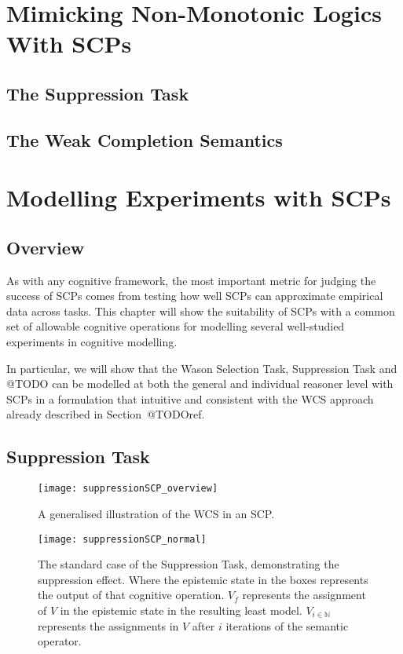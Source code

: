 \chapter{Mimicking Non-Monotonic Logics With SCPs} \label{chp:mimick}

\section{The Suppression Task}

\section{The Weak Completion Semantics}



\chapter{Modelling Experiments with SCPs} \label{chp:model}
\section{Overview}
As with any cognitive framework, the most important metric for judging the success of SCPs comes from testing how well SCPs can approximate empirical data across tasks. This chapter will show the suitability of SCPs with a common set of allowable cognitive operations for modelling several well-studied experiments in cognitive modelling.

In particular, we will show that the Wason Selection Task, Suppression Task and @TODO can be modelled at both the general and individual reasoner level with SCPs in a formulation that intuitive and consistent with the WCS approach already described in Section~@TODOref.
\section{Suppression Task}

\begin{figure*}
\begin{center}
 \centering \texttt{[image: suppressionSCP\_overview]}
\caption{A generalised illustration of the WCS in an SCP. }
\label {fig:supoverview}
\end{center}
\end{figure*}

\begin{figure*}
\begin{center}
 \centering \texttt{[image: suppressionSCP\_normal]}
\caption{The standard case of the Suppression Task, demonstrating the suppression effect. Where the epistemic state in the boxes represents the output of that cognitive operation. $V_f$ represents the assignment of $V$ in the epistemic state in the resulting least model. $V_{i\in \mathbb{N}}$ represents the assignments in $V$ after $i$ iterations of the semantic operator.}
\label {fig:supnormal}
\end{center}
\end{figure*}

